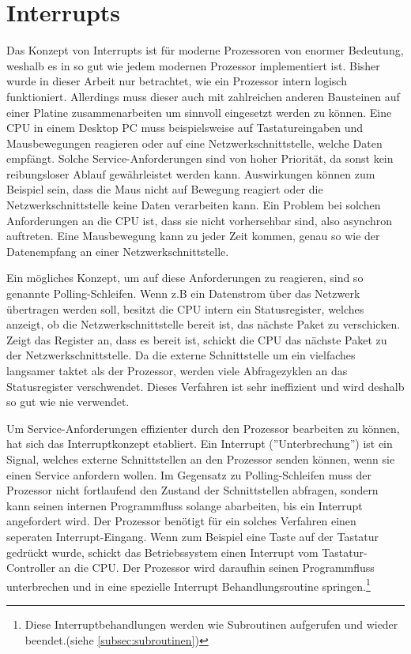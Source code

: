 \documentclass[a4paper,12pt]{article}
\begin{document}
\section{Interrupts}
Das Konzept von Interrupts ist für moderne Prozessoren von enormer Bedeutung, weshalb es in so gut wie jedem modernen Prozessor implementiert ist. Bisher wurde in dieser Arbeit nur betrachtet, wie ein Prozessor intern logisch funktioniert. Allerdings muss dieser auch mit zahlreichen anderen Bausteinen auf einer Platine zusammenarbeiten um sinnvoll eingesetzt werden zu können. Eine CPU in einem Desktop PC muss beispielsweise auf Tastatureingaben und Mausbewegungen reagieren oder auf eine Netzwerkschnittstelle, welche Daten empfängt. Solche Service-Anforderungen sind von hoher Priorität, da sonst kein reibungsloser Ablauf gewährleistet werden kann. Auswirkungen können zum Beispiel sein, dass die Maus nicht auf Bewegung reagiert oder die Netzwerkschnittstelle keine Daten verarbeiten kann. Ein Problem bei solchen Anforderungen an die CPU ist, dass sie nicht vorhersehbar sind, also asynchron auftreten. Eine Mausbewegung kann zu jeder Zeit kommen, genau so wie der Datenempfang an einer Netzwerkschnittstelle. \cite[S.112ff]{mikroprozessortechnik2011}
\par\bigskip
\noindent Ein mögliches Konzept, um auf diese Anforderungen zu reagieren, sind so genannte Polling-Schleifen. Wenn z.B ein Datenstrom über das Netzwerk übertragen werden soll, besitzt die CPU intern ein Statusregister, welches anzeigt, ob die Netzwerkschnittstelle bereit ist, das nächste Paket zu verschicken. Zeigt das Register an, dass es bereit ist, schickt die CPU das nächste Paket zu der Netzwerkschnittstelle. Da die externe Schnittstelle um ein vielfaches langsamer taktet als der Prozessor, werden viele Abfragezyklen an das Statusregister verschwendet. Dieses Verfahren ist sehr ineffizient und wird deshalb so gut wie nie verwendet. \cite{mikroprozessortechnik2011}
\par \bigskip
\noindent Um Service-Anforderungen effizienter durch den Prozessor bearbeiten zu können, hat sich das Interruptkonzept etabliert. Ein Interrupt (''Unterbrechung'') ist ein Signal, welches externe Schnittstellen an den Prozessor senden können, wenn sie einen Service anfordern wollen. Im Gegensatz zu Polling-Schleifen muss der Prozessor nicht fortlaufend den Zustand der Schnittstellen abfragen, sondern kann seinen internen Programmfluss solange abarbeiten, bis ein Interrupt angefordert wird. Der Prozessor benötigt für ein solches Verfahren einen seperaten Interrupt-Eingang. Wenn zum Beispiel eine Taste auf der Tastatur gedrückt wurde, schickt das Betriebssystem einen Interrupt vom Tastatur-Controller an die CPU. Der Prozessor wird daraufhin seinen Programmfluss unterbrechen und in eine spezielle Interrupt Behandlungsroutine springen.\footnote{Diese Interruptbehandlungen werden wie Subroutinen aufgerufen und wieder beendet.(siehe \ref{subsec:subroutinen})}
\end{document}
